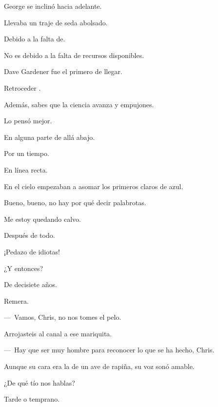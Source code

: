 \sk
George se inclinó hacia adelante. \nb{}

\sk
Llevaba un traje de seda abolsado. 

\sk
Debido a la falta de. 

\sk
No es debido a la falta de recursos disponibles. 

\sk
Dave Gardener fue el primero de llegar. 

\sk
Retroceder . 

\sk
Además, sabes que la ciencia avanza  y empujones. 

\sk
Lo pensó mejor. 

\sk
En alguna parte de allá abajo. 

\sk
Por un tiempo. 

\sk
En línea recta. 

\sk
En el cielo empezaban a asomar los primeros claros de azul. \nb{}

\sk
Bueno, bueno, no hay por qué decir palabrotas. 

\sk
Me estoy quedando calvo. 

\sk
Después de todo. 

\sk
¡Pedazo de idiotas! 

\sk
¿Y entonces? 

\sk
De decisiete años. 

\sk
Remera. 

\sk
---~Vamos, Chris, no nos tomes el pelo. 

\sk
Arrojasteis al canal a ese mariquita. 

\sk
---~Hay que ser muy hombre para reconocer lo que se ha hecho, Chris. \nb{}

\sk
Aunque su cara era la de un ave de rapiña, su voz sonó amable. 

\sk
¿De qué tío nos hablas? 

\sk
Tarde o temprano. 

